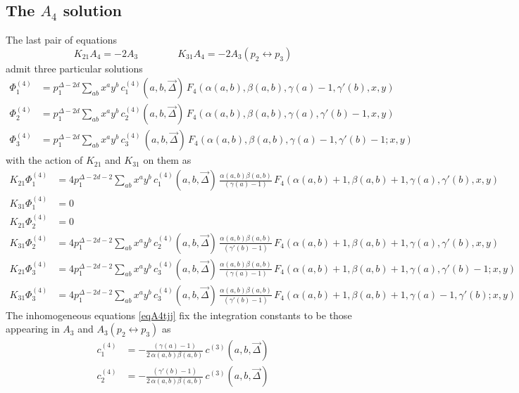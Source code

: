 \documentclass[a4paper,11pt,openright,twoside]{book}
\let\a=\alpha   \let\b=\beta   \let\g=\gamma   \let\d=\delta
\numberwithin{equation}{section}
\begin{document}
{{{\subsection{The $A_4$ solution}
The last pair of equations 
\begin{equation}
	K_{21} A_4 =-2 A_3 \qquad \qquad K_{31} A_4=-2 A_3 (p_2\leftrightarrow p_3)\label{eqA4tjj}
\end{equation}
admit three particular solutions
\begin{align}
	\Phi_1^{(4)}&= p_1^{\Delta-2d}\sum_{a b} x^a y^b\, c_1^{(4)}(a,b,\vec{\Delta})\,F_4(\alpha(a,b),\beta(a,b),\gamma(a)-1,\gamma'(b),x,y)\\
	\Phi_2^{(4)}&= p_1^{\Delta-2d}\sum_{a b} x^a y^b\, c_2^{(4)}(a,b,\vec{\Delta})\,F_4(\alpha(a,b),\beta(a,b),\gamma(a),\gamma'(b)-1,x,y)\\
	\Phi_3^{(4)}&= p_1^{\Delta-2d}\sum_{a b} x^a y^b\,c_3^{(4)}\,(a,b,\vec{\Delta})\,F_4(\a(a,b),\b(a,b),\g(a)-1,\g'(b)-1;x,y)
\end{align}
with the action of $K_{21}$ and $K_{31}$ on them as
\begin{align}
	K_{21}\Phi^{(4)}_1&=4p_1^{\Delta-2d-2}\sum_{a b} x^a y^b\, c_1^{(4)}(a,b,\vec{\Delta})\,\frac{\a(a,b)\b(a,b)}{(\g(a)-1)}\,F_4(\alpha(a,b)+1,\beta(a,b)+1,\gamma(a),\gamma'(b),x,y)\\
	K_{31}\Phi^{(4)}_1&=0\\[2.2ex]
	K_{21}\Phi^{(4)}_2&=0\\
	K_{31}\Phi^{(4)}_2&=4p_1^{\Delta-2d-2}\sum_{a b} x^a y^b\, c_2^{(4)}(a,b,\vec{\Delta})\,\frac{\a(a,b)\b(a,b)}{(\g'(b)-1)}\,F_4(\alpha(a,b)+1,\beta(a,b)+1,\gamma(a),\gamma'(b),x,y)\\[2.2ex]
	K_{21}\Phi^{(4)}_3&=4p_1^{\Delta-2d-2}\sum_{a b} x^a y^b\,c_3^{(4)}(a,b,\vec{\Delta})\,\frac{\a(a,b)\b(a,b)}{(\g(a)-1)}\,F_4(\a(a,b)+1,\b(a,b)+1,\g(a),\g'(b)-1;x,y)\\
	K_{31}\Phi^{(4)}_3&=4p_1^{\Delta-2d-2}\sum_{a b} x^a y^b\,c_3^{(4)}(a,b,\vec{\Delta})\,\frac{\a(a,b)\b(a,b)}{(\g'(b)-1)}\,F_4(\a(a,b)+1,\b(a,b)+1,\g(a)-1,\g'(b);x,y)
\end{align}
The inhomogeneous equations \eqref{eqA4tjj} fix the integration constants to be those appearing in $A_3$ and $A_3(p_2\leftrightarrow p_3)$ as
\begin{align}
	c_1^{(4)}&=-\frac{(\g(a)-1)}{2\,\a(a,b)\b(a,b)}\,c^{(3)}(a,b,\vec{\Delta})\\[1.2ex]
	c_2^{(4)}&=-\frac{(\g'(b)-1)}{2\,\a(a,b)\b(a,b)}\,c^{(3)}(a,b,\vec{\Delta})\\[1.2ex]

\end{align}}}}
\end{document}
